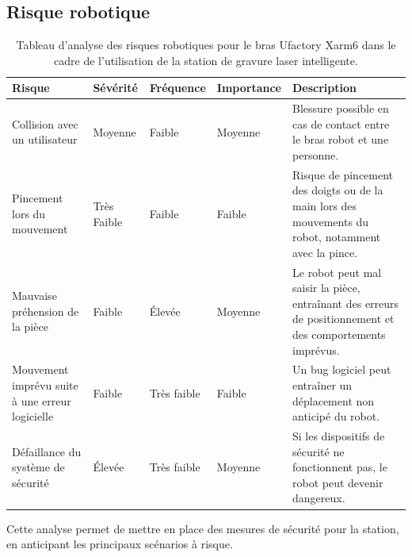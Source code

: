 \subsection{Risque robotique}

\begin{table}[H]
    \centering
    \renewcommand{\arraystretch}{1.4}
    \begin{tabular}{|p{3.5cm}|>{\centering\arraybackslash}m{2.2cm}|>{\centering\arraybackslash}m{2.2cm}|>{\centering\arraybackslash}m{2.2cm}|p{3.5cm}|}
        \hline
        \textbf{Risque} & \textbf{Sévérité} & \textbf{Fréquence} & \textbf{Importance} & \textbf{Description} \\
        \hline
        Collision avec un utilisateur & \cellcolor{orange!60}Moyenne & \cellcolor{yellow!60}Faible & \cellcolor{orange!60}Moyenne & Blessure possible en cas de contact entre le bras robot et une personne. \\
        \hline
        Pincement lors du mouvement & \cellcolor{green!60}Très Faible & \cellcolor{yellow!60}Faible & \cellcolor{yellow!60}Faible & Risque de pincement des doigts ou de la main lors des mouvements du robot, notamment avec la pince. \\
        \hline
        Mauvaise préhension de la pièce & \cellcolor{yellow!60}Faible & \cellcolor{red!60}Élevée & \cellcolor{orange!60}Moyenne & Le robot peut mal saisir la pièce, entraînant des erreurs de positionnement et des comportements imprévus. \\
        \hline
        Mouvement imprévu suite à une erreur logicielle & \cellcolor{yellow!60}Faible & \cellcolor{green!60}Très faible & \cellcolor{yellow!60}Faible & Un bug logiciel peut entraîner un déplacement non anticipé du robot. \\
        \hline
        Défaillance du système de sécurité & \cellcolor{red!60}Élevée & \cellcolor{green!60}Très faible & \cellcolor{orange!60}Moyenne & Si les dispositifs de sécurité ne fonctionnent pas, le robot peut devenir dangereux. \\
        \hline
    \end{tabular}
    \caption{Tableau d'analyse des risques robotiques pour le bras Ufactory Xarm6 dans le cadre de l'utilisation de la station de gravure laser intelligente.}
    \label{tab:risques_robotique}
\end{table}

Cette analyse permet de mettre en place des mesures de sécurité pour la station, en anticipant les principaux scénarios à risque.

